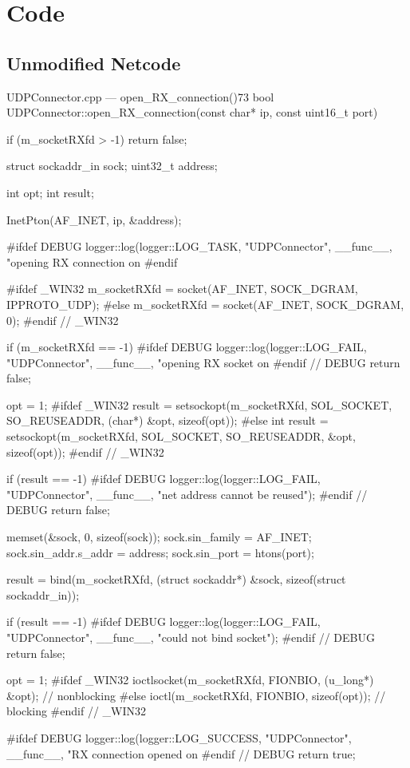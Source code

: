 \chapter{Code}\label{ax:code}

\section{Unmodified Netcode}\label{ax:code:netcode}

\begin{codelist}{UDPConnector.cpp --- open\_RX\_connection()}{73}
bool UDPConnector::open_RX_connection(const char* ip, const uint16_t port) {
    if (m_socketRXfd > -1)
        return false;

    struct sockaddr_in sock;
    uint32_t address;

    int opt;
    int result;

    InetPton(AF_INET, ip, &address);

#ifdef DEBUG
    logger::log(logger::LOG_TASK, "UDPConnector", __func__, "opening RX connection on %
#endif

#ifdef _WIN32
    m_socketRXfd = socket(AF_INET, SOCK_DGRAM, IPPROTO_UDP);
#else
    m_socketRXfd = socket(AF_INET, SOCK_DGRAM, 0);
#endif  // _WIN32

    if (m_socketRXfd == -1) {
#ifdef DEBUG
        logger::log(logger::LOG_FAIL, "UDPConnector", __func__, "opening RX socket on %
#endif  // DEBUG
        return false;
    }

    opt = 1;
#ifdef _WIN32
    result = setsockopt(m_socketRXfd, SOL_SOCKET, SO_REUSEADDR, (char*) &opt, sizeof(opt));
#else
    int result   = setsockopt(m_socketRXfd, SOL_SOCKET, SO_REUSEADDR, &opt, sizeof(opt));
#endif  // _WIN32

    if (result == -1) {
#ifdef DEBUG
        logger::log(logger::LOG_FAIL, "UDPConnector", __func__, "net address cannot be reused");
#endif  // DEBUG
        return false;
    }

    memset(&sock, 0, sizeof(sock));
    sock.sin_family      = AF_INET;
    sock.sin_addr.s_addr = address;
    sock.sin_port        = htons(port);

    result = bind(m_socketRXfd, (struct sockaddr*) &sock, sizeof(struct sockaddr_in));

    if (result == -1) {
#ifdef DEBUG
        logger::log(logger::LOG_FAIL, "UDPConnector", __func__, "could not bind socket");
#endif  // DEBUG
        return false;
    }

    opt = 1;
#ifdef _WIN32
    ioctlsocket(m_socketRXfd, FIONBIO, (u_long*) &opt);  // nonblocking
#else
    ioctl(m_socketRXfd, FIONBIO, sizeof(opt));  // blocking
#endif  // _WIN32

#ifdef DEBUG
    logger::log(logger::LOG_SUCCESS, "UDPConnector", __func__, "RX connection opened on %
#endif  // DEBUG
    return true;
}
\end{codelist}

